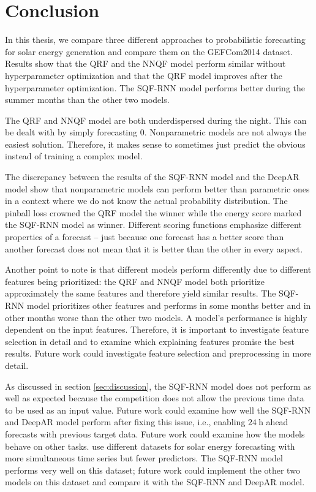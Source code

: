 \section{Conclusion}
\label{sec:conclusion}

In this thesis, we compare three different approaches to probabilistic forecasting 
for solar energy generation and compare them on the GEFCom2014 dataset. 
Results show that the QRF and the NNQF model perform similar without 
hyperparameter optimization and that the QRF model improves after the hyperparameter 
optimization. The SQF-RNN model performs better during the summer months than the other two models. 

The QRF and NNQF model are both underdispersed during the night. This can be dealt with by simply forecasting \(0\). 
Nonparametric models are not always the easiest solution. Therefore, it makes sense to sometimes just predict the obvious 
instead of training a complex model.

The discrepancy between the results of the SQF-RNN model and the DeepAR model show that 
nonparametric models can perform better than parametric ones in a context where we do not know the actual probability distribution. 
The pinball loss crowned the QRF model the winner while the energy score marked the SQF-RNN model as winner. 
Different scoring functions emphasize different properties of a forecast -- just because one forecast has a 
better score than another forecast does not mean that it is better than the other in every aspect.

Another point to note is that different models perform differently due to different features being 
prioritized: the QRF and NNQF model both prioritize approximately the same features and therefore 
yield similar results. The SQF-RNN model prioritizes other features and performs in some months better 
and in other months worse than the other two models. A model's performance is highly dependent on the input features.
Therefore, it is important to investigate feature selection in detail and to examine which explaining features promise the best results. 
Future work could investigate feature selection and preprocessing in more detail. 

As discussed in section \ref{sec:discussion}, the SQF-RNN model does not perform as well as expected 
because the competition does not allow the previous time data to be used as an input value. 
Future work could examine how well the SQF-RNN and DeepAR model perform after fixing this issue, 
i.e., enabling \(\SI{24}{\hour}\) ahead forecasts with previous target data. 
Future work could examine how the models behave on other tasks. 
\Textcite{Gasthaus2019} use different datasets for solar energy forecasting with more 
simultaneous time series but fewer predictors. 
The SQF-RNN model performs very well on this dataset; future work could implement the other two models 
on this dataset and compare it with the SQF-RNN and DeepAR model.

